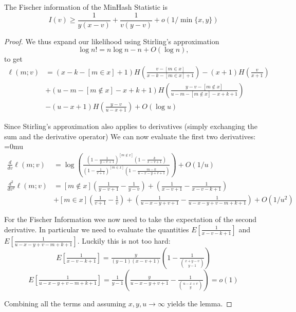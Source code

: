 \begin{lemma}\label{lem:fischer}
   The Fischer information of the MinHash Statistic is
   \[
   I(v)
   \ge \frac{1}{y(x-v)} + \frac1{v(y-v)} + o(1/\min\{x,y\})
   \]
\end{lemma}
\begin{proof}
   We thus expand our likelihood using Stirling's approximation
   \[
      \log n! = n\log n - n + O(\log n),
   \]
   to get
   \begin{align}
      \ell(m;v) &=
      (x-k-[m\in x]+1)H(\tfrac{v-[m\in x]}{x-k-[m\in x]+1})
               - (x+1) H(\tfrac{v}{x+1})
              \\&+(u-m-[m\not\in x]-x+k+1) H(\tfrac{y-v-[m\not\in x]}{u-m-[m\not\in x]-x+k+1})
              \\& -(u-x+1) H(\tfrac{y-v}{u-x+1})
   + O(\log u)
   \end{align}

   Since Stirling's approximation also applies to derivatives (simply exchanging the sum and the derivative operator)
   We can now evaluate the first two derivatives:
   {
      \thinmuskip=0mu
   \begin{align}
      \frac{d}{dv}\ell(m;v)&=
   \log\left(\frac{(1-\frac1{y-v+1})^{[m\not\in x]}(1-\frac{k}{x-v+1})}{(1-\frac 1{v+1})^{[m\in x]}(1-\frac{m-k}{u-x-y+v+1})}\right) + O(1/u)
      \label{eq:deriv1}
      \\
      \frac{d^2}{dv^2}\ell(m;v)&=
       [m\not\in x](\tfrac1{y-v+1}-\tfrac1{y-v})
      + (\tfrac1{x-v+1}-\tfrac1{x-v-k+1})
                               \\&
                               +[m\in x](\tfrac1{v+1}-\tfrac1{v})
      + (\tfrac1{u-x-y+v+1}-\tfrac1{u-x-y+v-m+k+1}) + O(1/u^2)
   \end{align}
   }


   For the Fischer Information wee now need to take the expectation of the second derivative.
   In particular we need to evaluate the quantities
   $E[\frac{1}{x-v-k+1}]$ and $E[\frac{1}{u-x-y+v-m+k+1}]$.
   Luckily this is not too hard:
   \[
      E\left[\tfrac{1}{x-v-k+1}\right] = \tfrac{y}{(y-1)(x-v+1)}\left(1-\tfrac{1}{\binom{x+y-v}{y-1}}\right)
   \]
   \[
      E\left[\tfrac{1}{u-x-y+v-m+k+1}\right] = \tfrac1{y-1}
   \left(\tfrac{y}{u-x-y+v+1}-\tfrac1{\binom{u-x+v}{y}}\right)
   =o(1)
   \]

   Combining all the terms and assuming $x,y,u\to\infty$ yields the lemma.




\end{proof}
